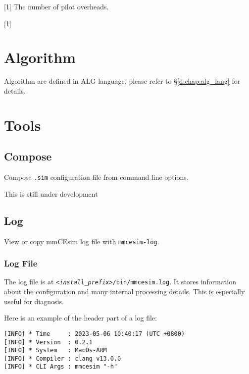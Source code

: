 [1]
The number of pilot overheads.

[1]


\section{Algorithm}

Algorithm are defined in ALG language,
please refer to \S\ref{d:chap:alg_lang} for details.

\section{Tools}

\subsection{Compose}

Compose \texttt{.sim} configuration file from command line options.
\begin{tip}[Note]
  This is still under development
\end{tip}

\subsection{Log}
View or copy mmCEsim log file with \texttt{mmcesim-log}.

\subsubsection{Log File}
The log file is at \texttt{\textit{<install\_prefix>}/bin/mmcesim.log}.
It stores information about the configuration and many internal processing details.
This is especially useful for diagnosis.

Here is an example of the header part of a log file:
\begin{lstlisting}
[INFO] * Time     : 2023-05-06 10:40:17 (UTC +0800)
[INFO] * Version  : 0.2.1
[INFO] * System   : MacOs-ARM
[INFO] * Compiler : clang v13.0.0
[INFO] * CLI Args : mmcesim "-h"
\end{lstlisting}

